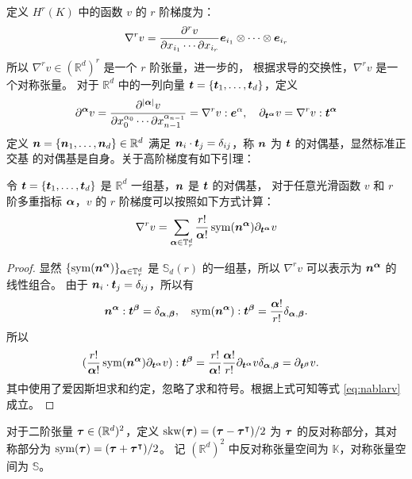 定义 $H^r(K)$ 中的函数 $v$ 的 $r$ 阶梯度为：
$$
\nabla^{r}v = \frac{\partial^{r}v}{\partial x_{i_1}\cdots\partial x_{i_r}} 
\boldsymbol{e}_{i_1}\otimes\cdots\otimes\boldsymbol{e}_{i_r}
$$
所以 $\nabla^{r}v \in (\mathbb{R}^d)^{r}$ 是一个 $r$ 阶张量，进一步的，
根据求导的交换性，$\nabla^{r}v$ 是一个对称张量。
对于 $\mathbb{R}^d$ 中的一列向量 $\boldsymbol{t} = \{\boldsymbol{t}_1, \ldots, \boldsymbol{t}_d\}$，定义
$$
\partial^{\boldsymbol{\alpha}}v = \frac{\partial^{|\boldsymbol{\alpha}|}v}{\partial
x_0^{\alpha_0}\cdots\partial x_{n-1}^{\alpha_{n-1}}} = \nabla^{r}v :
\boldsymbol{e}^{\alpha}, 
\quad \partial_{\boldsymbol{t}^{\boldsymbol{\alpha}}}v = \nabla^{r}v : \boldsymbol{t}^{\boldsymbol{\alpha}}
$$
定义 $\boldsymbol{n} = \{\boldsymbol{n}_1, \ldots, \boldsymbol{n}_d\} \in \mathbb{R}^d$ 满足
$\boldsymbol{n}_i\cdot\boldsymbol{t}_j = \delta_{ij}$，称 $\boldsymbol{n}$ 为 $\boldsymbol{t}$ 的对偶基，显然标准正交基
的对偶基是自身。关于高阶梯度有如下引理：
\begin{lemma}
    \label{lemma:nablarv}
    令 $\boldsymbol{t} = \{\boldsymbol{t}_1, \ldots, \boldsymbol{t}_d\}$ 是 $\mathbb{R}^d$ 一组基，$\boldsymbol{n}$ 是
    $\boldsymbol{t}$ 的对偶基，
    对于任意光滑函数 $v$ 和 $r$ 阶多重指标 $\boldsymbol{\alpha}$，$v$ 的 $r$
    阶梯度可以按照如下方式计算：
    \begin{equation}
    \nabla^r v = \sum_{\boldsymbol{\alpha} \in \mathbb{T}^d_r}
    \frac{r!}{\boldsymbol{\alpha}!}
    \operatorname{sym}(\boldsymbol{n}^{\boldsymbol{\alpha}})
    \partial_{\boldsymbol{t}^{\boldsymbol{\alpha}}}v
    \label{eq:nablarv}
    \end{equation}
\end{lemma}
\begin{proof}
    显然 $\{\operatorname{sym}(\boldsymbol{n}^{\boldsymbol{\alpha}})\}_{\boldsymbol{\alpha}\in \mathbb{T}_r^d}$
    是 $\mathbb{S}_{d}(r)$ 的一组基，所以 
    $\nabla^r v$ 可以表示为 $\boldsymbol{n}^{\boldsymbol{\alpha}}$ 的线性组合。
    由于 $\boldsymbol{n}_i\cdot\boldsymbol{t}_j = \delta_{ij}$，所以有
    $$
    \boldsymbol{n}^{\boldsymbol{\alpha}} : \boldsymbol{t}^{\boldsymbol{\beta}} = \delta_{\boldsymbol{\alpha}, \boldsymbol{\beta}}, \quad 
    \operatorname{sym}(\boldsymbol{n}^{\boldsymbol{\alpha}}) : \boldsymbol{t}^{\boldsymbol{\beta}} = \frac{\boldsymbol{\alpha}!}{r!}\delta_{\boldsymbol{\alpha}, \boldsymbol{\beta}}.
    $$
    所以
    $$
    \begin{aligned}
    (\frac{r!}{\boldsymbol{\alpha}!}
    \operatorname{sym}(\boldsymbol{n}^{\boldsymbol{\alpha}})
    \partial_{\boldsymbol{t}^{\boldsymbol{\alpha}}}v) : \boldsymbol{t}^{\boldsymbol{\beta}} & = 
    \frac{r!}{\boldsymbol{\alpha}!}\frac{\boldsymbol{\alpha}!}{r!} 
    \partial_{\boldsymbol{t}^{\boldsymbol{\alpha}}}v 
    \delta_{\boldsymbol{\alpha}, \boldsymbol{\beta}} = \partial_{\boldsymbol{t}^{\boldsymbol{\beta}}}v. 
    \end{aligned}
    $$
    其中使用了爱因斯坦求和约定，忽略了求和符号。根据上式可知等式
    \eqref{eq:nablarv} 成立。
\end{proof}
对于二阶张量 $\boldsymbol{\tau} \in (\mathbb{R}^{d})^2$，定义 
$\operatorname{skw}(\boldsymbol{\tau}) = (\boldsymbol{\tau} - \boldsymbol{\tau}^{\intercal})/2$ 为 $\boldsymbol{\tau}$
的反对称部分，其对称部分为 $\operatorname{sym}(\boldsymbol{\tau}) = (\boldsymbol{\tau} + \boldsymbol{\tau}^{\intercal})/2$。
记 $(\mathbb{R}^{d})^2$ 中反对称张量空间为 $\mathbb{K}$，对称张量空间为
$\mathbb{S}$。

